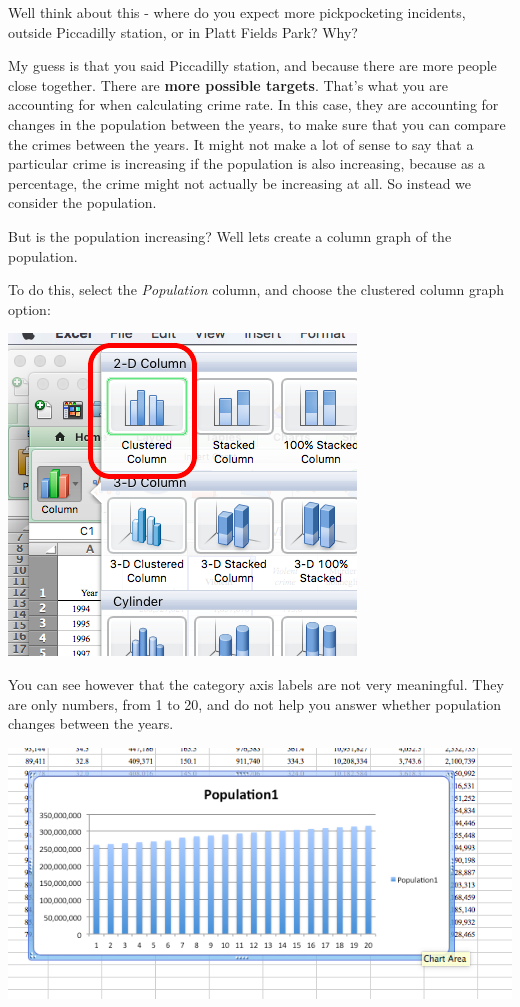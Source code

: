 \documentclass[]{book}
\theoremstyle{definition}
\theoremstyle{definition}
\theoremstyle{definition}
\theoremstyle{remark}
\begin{document}
Well think about this - where do you expect more pickpocketing
incidents, outside Piccadilly station, or in Platt Fields Park? Why?

My guess is that you said Piccadilly station, and because there are more
people close together. There are \textbf{more possible targets}. That's
what you are accounting for when calculating crime rate. In this case,
they are accounting for changes in the population between the years, to
make sure that you can compare the crimes between the years. It might
not make a lot of sense to say that a particular crime is increasing if
the population is also increasing, because as a percentage, the crime
might not actually be increasing at all. So instead we consider the
population.

But is the population increasing? Well lets create a column graph of the
population.

To do this, select the \emph{Population} column, and choose the
clustered column graph option:

\includegraphics{imgs/desc_viz_1.png}

You can see however that the category axis labels are not very
meaningful. They are only numbers, from 1 to 20, and do not help you
answer whether population changes between the years.

\includegraphics{imgs/pop_blue.png}
\end{document}
